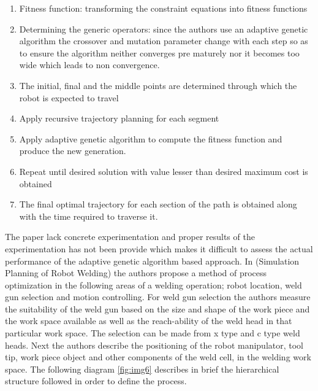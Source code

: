 \begin{enumerate}
\item Fitness function: transforming the constraint equations into fitness functions
\item Determining the generic operators: since the authors use an adaptive genetic algorithm the crossover and mutation parameter change with each step so as to ensure the algorithm neither converges pre maturely nor it becomes too wide which leads to non convergence.
\item The initial, final and the middle points are determined through which the robot is expected to travel
\item Apply recursive trajectory planning for each segment
\item Apply adaptive genetic algorithm to compute the fitness function and produce the new generation.
\item Repeat until desired solution with value lesser than desired maximum cost is obtained
\item The final optimal trajectory for each section of the path is obtained along with the time required to traverse it.
\end{enumerate} 
The paper lack concrete experimentation and proper results of the experimentation has not been provide which makes it difficult to assess the actual performance of the adaptive genetic algorithm based approach. 
In \cite{12}(Simulation Planning of Robot Welding) the authors propose a method of process optimization in the following areas of a welding operation; robot location, weld gun selection and motion controlling.            
For weld gun selection the authors measure the suitability of the weld gun based on the size and shape of the work piece and the work space available as well as the reach-ability of the weld head in that particular work space. The selection can be made from x type and c type weld heads. Next the authors describe the positioning of the robot manipulator, tool tip, work piece object and other components of the weld cell, in the welding work space. The following diagram \ref{fig:img6} describes in brief the hierarchical structure followed in order to define the process.
